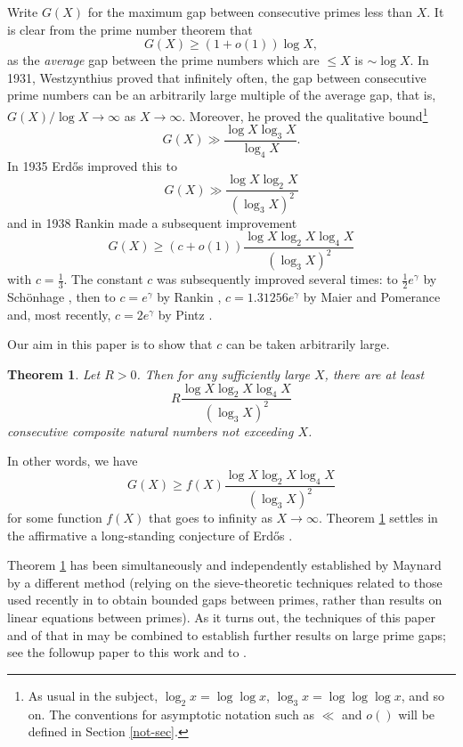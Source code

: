 \documentclass[12pt]{amsart}
\numberwithin{equation}{section}  %
\theoremstyle{remark}
\theoremstyle{plain}
\newtheorem{thm}{Theorem}
\numberwithin{equation}{section}
\renewcommand{\le}{\leqslant}
\renewcommand{\geq}{\geqslant}
\renewcommand{\(}{\left(}
\renewcommand{\)}{\right)}
\newcommand{\asym}{\sim}   %
\begin{document}
Write $G(X)$ for the maximum gap between consecutive primes less than $X$. It is clear from the prime number theorem that
\[ G(X) \geq (1 + o(1)) \log X,\]
as the \emph{average} gap between the prime numbers which are $\le X$ is $\asym \log X$. 
In 1931, Westzynthius \cite{West} proved that infinitely often, the gap between consecutive 
prime numbers can be an arbitrarily large multiple of the average gap, that is,
$G(X)/\log X\to \infty$ as $X\to\infty$.  Moreover, he proved the qualitative
bound\footnote{As usual in the subject, $\log_2 x = \log \log x$, $\log_3 x = \log \log \log x$, and so on.  The conventions for asymptotic notation such as $\ll$ and $o()$ will be defined in Section \ref{not-sec}.}
\[
G(X) \gg \frac{\log X \log_3 X}{\log_4 X}.
\]
In 1935 Erd\H{o}s \cite{erdos-gaps} improved this to
\[ G(X) \gg \frac{\log X \log_2X}{(\log_3X)^2}\] and in 1938 Rankin \cite{R1} 
made a subsequent improvement
\[ G(X) \geq (c + o(1)) \frac{\log X \log_2 X \log_4 X}{(\log_3 X)^2}\] with $c = \frac{1}{3}$. The constant $c$ was subsequently improved several times: to $\frac{1}{2}e^{\gamma}$ by Sch\"onhage \cite{schonhage}, then to $c = e^{\gamma}$ by Rankin \cite{rankin-1963}, $c = 1.31256 e^{\gamma}$ by Maier and Pomerance \cite{MP} and, most recently, $c = 2e^{\gamma}$ by Pintz \cite{P}.

Our aim in this paper is to show that $c$ can be taken arbitrarily large.

\begin{thm}\label{mainthm} Let $R>0$.  Then for any sufficiently large $X$,
there are at least
$$R\frac{\log X \log_2 X \log_4 X}{(\log_3 X)^2}$$
consecutive composite natural numbers not exceeding $X$.
\end{thm}

In other words, we have
$$ G(X) \geq f(X) \frac{\log X \log_2 X \log_4 X}{(\log_3 X)^2}$$
for some function $f(X)$ that goes to infinity as $X \to \infty$.
Theorem \ref{mainthm} settles in the affirmative a long-standing conjecture of
Erd\H os \cite{Erd90}.

Theorem \ref{mainthm} has been simultaneously and independently established by Maynard \cite{maynard} by a different method (relying on the sieve-theoretic techniques related to those used recently in \cite{maynard-small} to obtain bounded gaps between primes, rather than results on linear equations between primes).  As it turns out, the techniques of this paper and of that in \cite{maynard} may be combined to establish further results on large prime gaps; see the followup paper \cite{FGKMT} to this work and to \cite{maynard}.
\end{document}
